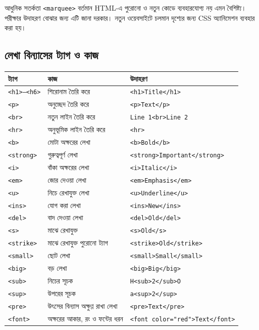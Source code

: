 \begin{mistakebox}{আধুনিক সতর্কতা}
\texttt{<marquee>} বর্তমান HTML-এ পুরোনো ও নতুন কোডে ব্যবহারযোগ্য নয় এমন বৈশিষ্ট্য। পরীক্ষার উদাহরণ বোঝার জন্য এটি জানা দরকার। নতুন ওয়েবসাইটে চলমান দৃশ্যের জন্য CSS অ্যানিমেশন ব্যবহার করা হয়।
\end{mistakebox}

\subsection{লেখা বিন্যাসের ট্যাগ ও কাজ}

\begin{center}
\footnotesize
\begin{tabular}{|p{}|p{}|p{}|}
\hline
\textbf{ট্যাগ} & \textbf{কাজ} & \textbf{উদাহরণ} \\
\hline
\texttt{<h1>--<h6>} & শিরোনাম তৈরি করে & \texttt{<h1>Title</h1>} \\
\hline
\texttt{<p>} & অনুচ্ছেদ তৈরি করে & \texttt{<p>Text</p>} \\
\hline
\texttt{<br>} & নতুন লাইন তৈরি করে & \texttt{Line 1<br>Line 2} \\
\hline
\texttt{<hr>} & অনুভূমিক লাইন তৈরি করে & \texttt{<hr>} \\
\hline
\texttt{<b>} & মোটা অক্ষরের লেখা & \texttt{<b>Bold</b>} \\
\hline
\texttt{<strong>} & গুরুত্বপূর্ণ লেখা & \texttt{<strong>Important</strong>} \\
\hline
\texttt{<i>} & বাঁকা অক্ষরের লেখা & \texttt{<i>Italic</i>} \\
\hline
\texttt{<em>} & জোর দেওয়া লেখা & \texttt{<em>Emphasis</em>} \\
\hline
\texttt{<u>} & নিচে রেখাযুক্ত লেখা & \texttt{<u>Underline</u>} \\
\hline
\texttt{<ins>} & যোগ করা লেখা & \texttt{<ins>New</ins>} \\
\hline
\texttt{<del>} & বাদ দেওয়া লেখা & \texttt{<del>Old</del>} \\
\hline
\texttt{<s>} & মাঝে রেখাযুক্ত & \texttt{<s>Old</s>} \\
\hline
\texttt{<strike>} & মাঝে রেখাযুক্ত পুরোনো ট্যাগ & \texttt{<strike>Old</strike>} \\
\hline
\texttt{<small>} & ছোট লেখা & \texttt{<small>Small</small>} \\
\hline
\texttt{<big>} & বড় লেখা & \texttt{<big>Big</big>} \\
\hline
\texttt{<sub>} & নিচের সূচক & \texttt{H<sub>2</sub>O} \\
\hline
\texttt{<sup>} & উপরের সূচক & \texttt{a<sup>2</sup>} \\
\hline
\texttt{<pre>} & উৎসের বিন্যাস অক্ষুণ্ণ রাখা লেখা & \texttt{<pre>Text</pre>} \\
\hline
\texttt{<font>} & অক্ষরের আকার, রং ও ফন্টের ধরন & \texttt{<font color="red">Text</font>} \\
\hline
\end{tabular}
\normalsize
\end{center}

